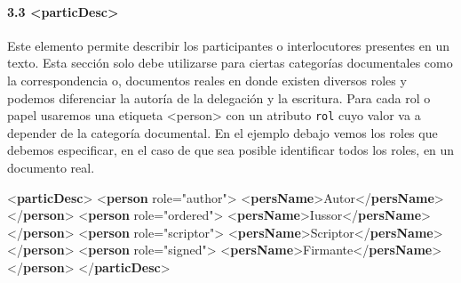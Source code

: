 \documentclass[
]{book}
\newenvironment{Shaded}{\begin{snugshade}}{\end{snugshade}}
\newcommand{\KeywordTok}[1]{\textcolor[rgb]{0.13,0.29,0.53}{\textbf{#1}}}
\newcommand{\NormalTok}[1]{#1}
\newcommand{\OtherTok}[1]{\textcolor[rgb]{0.56,0.35,0.01}{#1}}
\newcommand{\StringTok}[1]{\textcolor[rgb]{0.31,0.60,0.02}{#1}}
\begin{document}
\hypertarget{particdesc}{%
\paragraph*{\texorpdfstring{3.3 { \textless particDesc\textgreater{} }}{3.3  \textless particDesc\textgreater{} }}\label{particdesc}}

Este elemento permite describir los participantes o interlocutores presentes en un texto. Esta sección solo debe utilizarse para ciertas categorías documentales como la correspondencia o, documentos reales en donde existen diversos roles y podemos diferenciar la autoría de la delegación y la escritura. Para cada rol o papel usaremos una etiqueta { \textless person\textgreater{} } con un atributo \texttt{rol} cuyo valor va a depender de la categoría documental. En el ejemplo debajo vemos los roles que debemos especificar, en el caso de que sea posible identificar todos los roles, en un documento real.

\begin{Shaded}
\begin{Highlighting}[]
\NormalTok{\textless{}}\KeywordTok{particDesc}\NormalTok{\textgreater{} }
\NormalTok{  \textless{}}\KeywordTok{person}\OtherTok{ role=}\StringTok{"author"}\NormalTok{\textgreater{}}
\NormalTok{    \textless{}}\KeywordTok{persName}\NormalTok{\textgreater{}Autor\textless{}/}\KeywordTok{persName}\NormalTok{\textgreater{}}
\NormalTok{  \textless{}/}\KeywordTok{person}\NormalTok{\textgreater{}}
\NormalTok{  \textless{}}\KeywordTok{person}\OtherTok{ role=}\StringTok{"ordered"}\NormalTok{\textgreater{}}
\NormalTok{    \textless{}}\KeywordTok{persName}\NormalTok{\textgreater{}Iussor\textless{}/}\KeywordTok{persName}\NormalTok{\textgreater{}}
\NormalTok{  \textless{}/}\KeywordTok{person}\NormalTok{\textgreater{}}
\NormalTok{  \textless{}}\KeywordTok{person}\OtherTok{ role=}\StringTok{"scriptor"}\NormalTok{\textgreater{}}
\NormalTok{    \textless{}}\KeywordTok{persName}\NormalTok{\textgreater{}Scriptor\textless{}/}\KeywordTok{persName}\NormalTok{\textgreater{}}
\NormalTok{  \textless{}/}\KeywordTok{person}\NormalTok{\textgreater{}}
\NormalTok{  \textless{}}\KeywordTok{person}\OtherTok{ role=}\StringTok{"signed"}\NormalTok{\textgreater{}}
\NormalTok{    \textless{}}\KeywordTok{persName}\NormalTok{\textgreater{}Firmante\textless{}/}\KeywordTok{persName}\NormalTok{\textgreater{}}
\NormalTok{  \textless{}/}\KeywordTok{person}\NormalTok{\textgreater{}}
\NormalTok{\textless{}/}\KeywordTok{particDesc}\NormalTok{\textgreater{}}
\end{Highlighting}
\end{Shaded}
\end{document}
